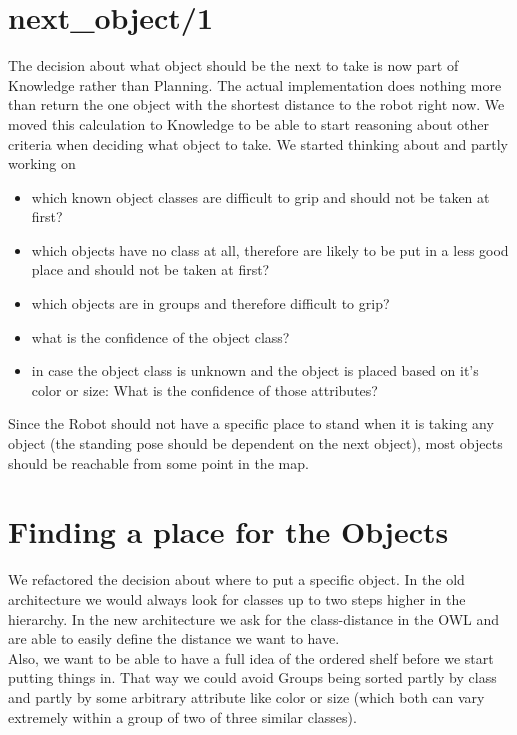 \documentclass[main.tex]{subfiles}
\begin{document}
		\section{next\_object/1}
		The decision about what object should be the next to take is now part of Knowledge rather than Planning. The actual implementation does nothing more than return the one object with the shortest distance to the robot right now. We moved this calculation to Knowledge to be able to start reasoning about other criteria when deciding what object to take. We started thinking about and partly working on
\begin{itemize}
\item which known object classes are difficult to grip and should not be taken at first?
\item which objects have no class at all, therefore are likely to be put in a less good place and should not be taken at first?
\item which objects are in groups and therefore difficult to grip?
\item what is the confidence of the object class?
\item in case the object class is unknown and the object is placed based on it's color or size: What is the confidence of those attributes?
\end{itemize}

Since the Robot should not have a specific place to stand when it is taking any object (the standing pose should be dependent on the next object), most objects should be reachable from some point in the map.

		\section{Finding a place for the Objects}
		We refactored the decision about where to put a specific object. In the old architecture we would always look for classes up to two steps higher in the hierarchy. In the new architecture we ask for the class-distance in the OWL and are able to easily define the distance we want to have.\\
Also, we want to be able to have a full idea of the ordered shelf before we start putting things in. That way we could avoid Groups being sorted partly by class and partly by some arbitrary attribute like color or size (which both can vary extremely within a group of two of three similar classes). 
\end{document}
